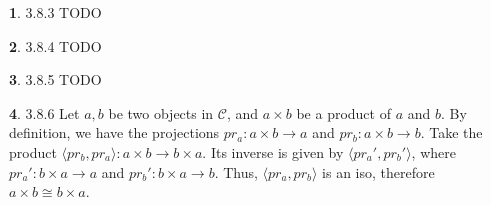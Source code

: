 \documentclass{article}
\theoremstyle{definition}
\newcommand{\CC}{\mathscr{C}}
\theoremstyle{definition}
\theoremstyle{definition}
\newtheorem{solution-internal}{}[subsection]
\newenvironment{solution}{
  \begin{solution-internal}
}{
  \end{solution-internal}
}
\begin{document}
\begin{solution}
  3.8.3 TODO
\end{solution}
\begin{solution}
  3.8.4 TODO
\end{solution}
\begin{solution}
  3.8.5 TODO
\end{solution}
\begin{solution}
  3.8.6 Let $a, b$ be two objects in $\CC$, and $a \times b$ be a product of $a$
  and $b$. By definition, we have the projections $pr_a\colon a \times b \to a$
  and $pr_b\colon a \times b \to b$. Take the product $\langle pr_b, pr_a
  \rangle\colon a \times b \to b \times a$. Its inverse is given by $\langle
  pr_a', pr_b'\rangle$, where $pr_a'\colon b \times a \to a$ and $pr_b' \colon b
  \times a \to b$. Thus, $\langle pr_a, pr_b \rangle$ is an iso, therefore
  $a\times b \cong b \times a$.
  \begin{center}
  \end{center}
\end{solution}
\end{document}
